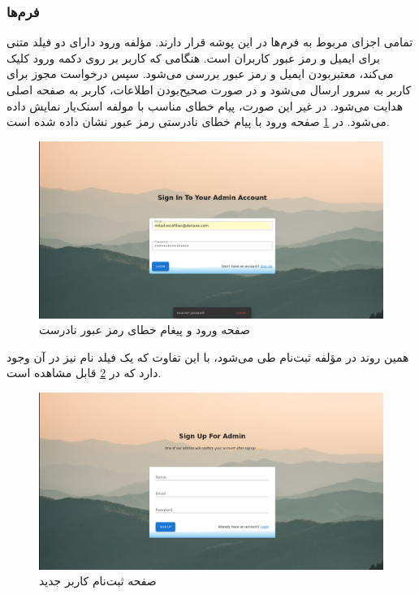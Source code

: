\subsubsection{فرم‌ها}

تمامی اجزای مربوط به فرم‌ها در این پوشه قرار دارند. مؤلفه ورود دارای دو فیلد متنی برای ایمیل و رمز عبور کاربران است. هنگامی که کاربر بر روی دکمه ورود کلیک می‌کند، معتبربودن ایمیل و رمز عبور بررسی می‌شود. سپس درخواست مجوز برای کاربر به سرور ارسال می‌شود و در صورت صحیح‌بودن اطلاعات، کاربر به صفحه اصلی هدایت می‌شود. در غیر این صورت، پیام خطای مناسب با مولفه اسنک‌یار نمایش داده می‌شود. در \cref{fig:login_page} صفحه ورود با پیام خطای نادرستی رمز عبور نشان داده شده است.

\begin{figure}[!h]
\centering\includegraphics[scale=.38]{login_page.png}
\caption{صفحه ورود و پیغام خطای رمز عبور نادرست}\label{fig:login_page}
\end{figure}

همین روند در مؤلفه ثبت‌نام طی می‌شود، با این تفاوت که یک فیلد نام نیز در آن وجود دارد که در \cref{fig:signup_page} قابل مشاهده است.

\begin{figure}[!h]
\centering\includegraphics[scale=.38]{signup_page.png}
\caption{صفحه ثبت‌نام کاربر جدید}\label{fig:signup_page}
\end{figure}

